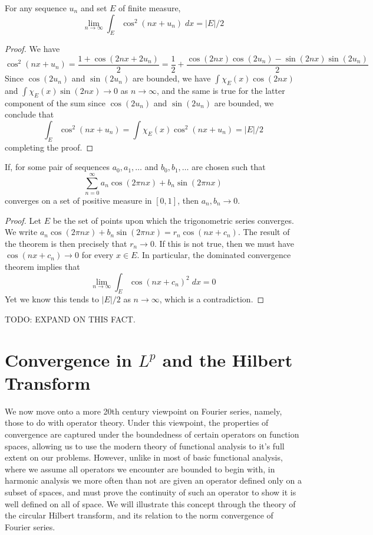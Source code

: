 \begin{lemma}
  For any sequence $u_n$ and set $E$ of finite measure,
  \[ \lim_{n \to \infty} \int_E \cos^2(nx + u_n)\; dx = |E|/2 \]
\end{lemma}
\begin{proof}
  We have
  \[ \cos^2(nx + u_n) = \frac{1 + \cos(2nx + 2u_n)}{2} = \frac{1}{2} + \frac{\cos(2nx) \cos(2u_n) - \sin(2nx) \sin(2u_n)}{2} \]
  Since $\cos(2u_n)$ and $\sin(2u_n)$ are bounded, we have $\int \chi_E(x) \cos(2nx)$ and $\int \chi_E(x) \sin(2nx) \to 0$ as $n \to \infty$, and the same is true for the latter component of the sum since $\cos(2u_n)$ and $\sin(2u_n)$ are bounded, we conclude that
  \[ \int_E \cos^2(nx + u_n) = \int \chi_E(x) \cos^2(nx + u_n) = |E|/2 \]
  completing the proof.
\end{proof}

\begin{theorem}
  If, for some pair of sequences $a_0, a_1, \dots$ and $b_0, b_1, \dots$ are chosen such that
  \[ \sum_{n = 0}^\infty a_n \cos(2 \pi nx) + b_n \sin(2 \pi nx) \]
  converges on a set of positive measure in $[0,1]$, then $a_n, b_n \to 0$.
\end{theorem}
\begin{proof}
  Let $E$ be the set of points upon which the trigonometric series converges. We write $a_n \cos(2 \pi n x) + b_n \sin(2 \pi n x) = r_n \cos(nx + c_n)$. The result of the theorem is then precisely that $r_n \to 0$. If this is not true, then we must have $\cos(nx + c_n) \to 0$ for every $x \in E$. In particular, the dominated convergence theorem implies that
  \[ \lim_{n \to \infty} \int_E \cos(nx + c_n)^2\; dx = 0 \]
  Yet we know this tends to $|E|/2$ as $n \to \infty$, which is a contradiction.
\end{proof}

TODO: EXPAND ON THIS FACT.






\section{Convergence in $L^p$ and the Hilbert Transform}

We now move onto a more 20th century viewpoint on Fourier series, namely, those to do with operator theory. Under this viewpoint, the properties of convergence are captured under the boundedness of certain operators on function spaces, allowing us to use the modern theory of functional analysis to it's full extent on our problems. However, unlike in most of basic functional analysis, where we assume all operators we encounter are bounded to begin with, in harmonic analysis we more often than not are given an operator defined only on a subset of spaces, and must prove the continuity of such an operator to show it is well defined on all of space. We will illustrate this concept through the theory of the circular Hilbert transform, and its relation to the norm convergence of Fourier series.

